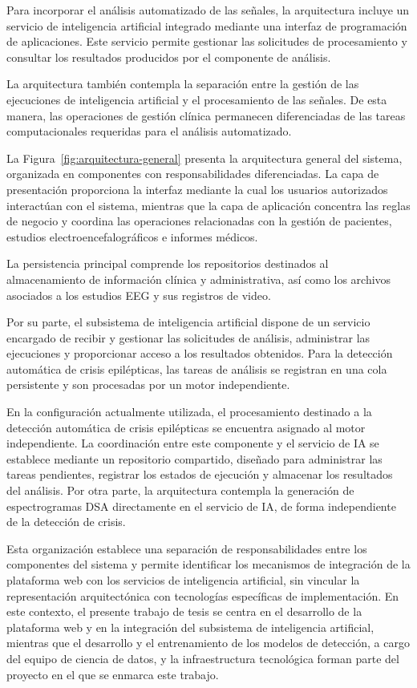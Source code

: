Para incorporar el análisis automatizado de las señales,
la arquitectura incluye un servicio de inteligencia artificial
integrado mediante una interfaz de programación de aplicaciones.
Este servicio permite gestionar las solicitudes de procesamiento
y consultar los resultados producidos por el componente de análisis.

La arquitectura también contempla la separación entre la
gestión de las ejecuciones de inteligencia artificial y el
procesamiento de las señales. De esta manera, las operaciones
de gestión clínica permanecen diferenciadas de las tareas
computacionales requeridas para el análisis automatizado.

La Figura~\ref{fig:arquitectura-general} presenta la arquitectura general del sistema, organizada en componentes con responsabilidades diferenciadas. La capa de presentación proporciona la interfaz mediante la cual los usuarios autorizados interactúan con el sistema, mientras que la capa de aplicación concentra las reglas de negocio y coordina las operaciones relacionadas con la gestión de pacientes, estudios electroencefalográficos e informes médicos.

La persistencia principal comprende los repositorios destinados al almacenamiento de información clínica y administrativa, así como los archivos asociados a los estudios EEG y sus registros de video.

Por su parte, el subsistema de inteligencia artificial dispone de un servicio encargado de recibir y gestionar las solicitudes de análisis, administrar las ejecuciones y proporcionar acceso a los resultados obtenidos. Para la detección automática de crisis epilépticas, las tareas de análisis se registran en una cola persistente y son procesadas por un motor independiente.


En la configuración actualmente utilizada, el procesamiento destinado a la detección automática de crisis epilépticas se encuentra asignado al motor independiente. La coordinación entre este componente y el servicio de IA se establece mediante un repositorio compartido, diseñado para administrar las tareas pendientes, registrar los estados de ejecución y almacenar los resultados del análisis. Por otra parte, la arquitectura contempla la generación de espectrogramas DSA directamente en el servicio de IA, de forma independiente de la detección de crisis.


Esta organización establece una separación de responsabilidades entre los componentes del sistema y permite identificar los mecanismos de integración de la plataforma web con los servicios de inteligencia artificial, sin vincular la representación arquitectónica con tecnologías específicas de implementación. En este contexto, el presente trabajo de tesis se centra en el desarrollo de la plataforma web y en la integración del subsistema de inteligencia artificial, mientras que el desarrollo y el entrenamiento de los modelos de detección, a cargo del equipo de ciencia de datos, y la infraestructura tecnológica forman parte del proyecto en el que se enmarca este trabajo.


